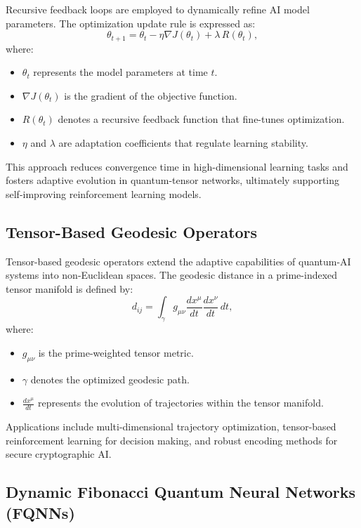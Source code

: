 \documentclass{article}
\theoremstyle{plain}
\begin{document}
\begin{itemize}
\begin{itemize}
Recursive feedback loops are employed to dynamically refine AI model parameters. The optimization update rule is expressed as:
\begin{equation}
\theta_{t+1} = \theta_t - \eta \nabla J(\theta_t) + \lambda\, R(\theta_t),
\end{equation}
where:
\begin{itemize}
    \item \(\theta_t\) represents the model parameters at time \(t\).
    \item \(\nabla J(\theta_t)\) is the gradient of the objective function.
    \item \(R(\theta_t)\) denotes a recursive feedback function that fine-tunes optimization.
    \item \(\eta\) and \(\lambda\) are adaptation coefficients that regulate learning stability.
\end{itemize}
This approach reduces convergence time in high-dimensional learning tasks and fosters adaptive evolution in quantum-tensor networks, ultimately supporting self-improving reinforcement learning models.

\subsection{Tensor-Based Geodesic Operators}

Tensor-based geodesic operators extend the adaptive capabilities of quantum-AI systems into non-Euclidean spaces. The geodesic distance in a prime-indexed tensor manifold is defined by:
\begin{equation}
d_{ij} = \int_{\gamma} g_{\mu\nu} \frac{dx^\mu}{dt}\frac{dx^\nu}{dt}\, dt,
\end{equation}
where:
\begin{itemize}
    \item \(g_{\mu\nu}\) is the prime-weighted tensor metric.
    \item \(\gamma\) denotes the optimized geodesic path.
    \item \(\frac{dx^\mu}{dt}\) represents the evolution of trajectories within the tensor manifold.
\end{itemize}
Applications include multi-dimensional trajectory optimization, tensor-based reinforcement learning for decision making, and robust encoding methods for secure cryptographic AI.

\subsection{Dynamic Fibonacci Quantum Neural Networks (FQNNs)}


\end{itemize}
\end{itemize}
\end{document}

